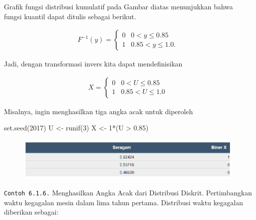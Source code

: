 \documentclass[
]{book}
\newenvironment{Shaded}{\begin{snugshade}}{\end{snugshade}}
\newcommand{\DecValTok}[1]{\textcolor[rgb]{0.00,0.00,0.81}{#1}}
\newcommand{\FloatTok}[1]{\textcolor[rgb]{0.00,0.00,0.81}{#1}}
\newcommand{\FunctionTok}[1]{\textcolor[rgb]{0.00,0.00,0.00}{#1}}
\newcommand{\NormalTok}[1]{#1}
\newcommand{\OtherTok}[1]{\textcolor[rgb]{0.56,0.35,0.01}{#1}}
\newcommand{\SpecialCharTok}[1]{\textcolor[rgb]{0.00,0.00,0.00}{#1}}
\begin{document}
Grafik fungsi distribusi kumulatif pada Gambar diatas menunjukkan bahwa fungsi kuantil dapat ditulis sebagai berikut.

\[\begin{aligned}
F^{-1}(y) = \left\{ \begin{array}{cc}
              0 & 0<y \leq 0.85 \\
              1 & 0.85 < y  \leq  1.0 .
            \end{array} \right.
\end{aligned}\]

Jadi, dengan transformasi invers kita dapat mendefinisikan

\[\begin{aligned}
X = \left\{ \begin{array}{cc}
              0 & 0<U \leq 0.85  \\
              1 &  0.85 < U  \leq  1.0
            \end{array} \right.
\end{aligned}\]

Misalnya, ingin menghasilkan tiga angka acak untuk diperoleh

\begin{Shaded}
\begin{Highlighting}[]
\FunctionTok{set.seed}\NormalTok{(}\DecValTok{2017}\NormalTok{)}
\NormalTok{U }\OtherTok{\textless{}{-}} \FunctionTok{runif}\NormalTok{(}\DecValTok{3}\NormalTok{)}
\NormalTok{X }\OtherTok{\textless{}{-}} \DecValTok{1}\SpecialCharTok{*}\NormalTok{(U }\SpecialCharTok{\textgreater{}} \FloatTok{0.85}\NormalTok{)}
\end{Highlighting}
\end{Shaded}

\begin{figure}

{\centering \includegraphics[width=1\linewidth]{images/6.1.2-3} 

}

\end{figure}

\texttt{Contoh\ 6.1.6.} Menghasilkan Angka Acak dari Distribusi Diskrit. Pertimbangkan waktu kegagalan mesin dalam lima tahun pertama. Distribusi waktu kegagalan diberikan sebagai:
\end{document}
